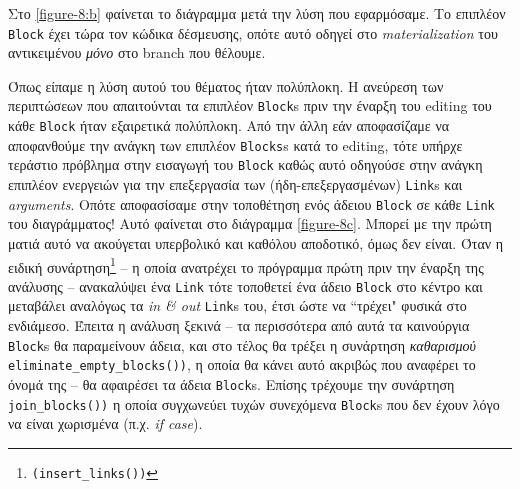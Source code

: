Στο \ref{figure-8:b} φαίνεται το διάγραμμα μετά την λύση που εφαρμόσαμε. Το
επιπλέον \texttt{Block} έχει τώρα τον κώδικα δέσμευσης, οπότε αυτό οδηγεί στο
\textit{materialization} του αντικειμένου \textit{μόνο} στο branch που θέλουμε.

Όπως είπαμε η λύση αυτού του θέματος ήταν πολύπλοκη. Η ανεύρεση των περιπτώσεων
που απαιτούνται τα επιπλέον \texttt{Block}s πριν την έναρξη του editing του κάθε
\texttt{Block} ήταν εξαιρετικά πολύπλοκη. Από την άλλη εάν αποφασίζαμε να
αποφανθούμε την ανάγκη των επιπλέον \texttt{Blocks}s κατά το editing, τότε
υπήρχε τεράστιο πρόβλημα στην εισαγωγή του \texttt{Block} καθώς αυτό οδηγούσε
στην ανάγκη επιπλέον ενεργειών για την επεξεργασία των (ήδη-επεξεργασμένων)
\texttt{Link}s και \textit{arguments}. Οπότε αποφασίσαμε στην τοποθέτηση ενός
άδειου \texttt{Block} σε κάθε \texttt{Link} του διαγράμματος! Αυτό φαίνεται στο
διάγραμμα \ref {figure-8c}. Μπορεί με την πρώτη ματιά αυτό να ακούγεται
υπερβολικό και καθόλου αποδοτικό, όμως δεν είναι. Όταν η ειδική
συνάρτηση\footnote{\texttt{(insert\_links())}} – η οποία ανατρέχει το πρόγραμμα
πρώτη πριν την έναρξη της ανάλυσης – ανακαλύψει ένα \texttt{Link} τότε τοποθετεί
ένα άδειο \texttt{Block} στο κέντρο και μεταβάλει αναλόγως τα \textit{in \& out}
\texttt{Link}s του, έτσι ώστε να ``τρέχει" φυσικά στο ενδιάμεσο. Έπειτα η ανάλυση
ξεκινά – τα περισσότερα από αυτά τα καινούργια \texttt{Block}s θα παραμείνουν
άδεια, και στο τέλος θα τρέξει η συνάρτηση \textit{καθαρισμού}
\texttt{eliminate\_empty\_blocks())}, η οποία θα κάνει αυτό ακριβώς που αναφέρει
το όνομά της – θα αφαιρέσει τα άδεια \texttt{Block}s. Επίσης τρέχουμε την
συνάρτηση \texttt{join\_blocks())} η οποία συγχωνεύει τυχών συνεχόμενα
\texttt{Block}s που δεν έχουν λόγο να είναι χωρισμένα (π.χ. \textit{if case}).

